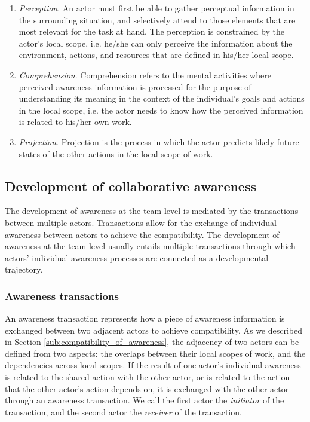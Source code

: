 \begin{enumerate}
	\item \emph{Perception}. An actor must first be able to gather perceptual information in the surrounding situation, and selectively attend to those elements that are most relevant for the task at hand. The perception is constrained by the actor's local scope, i.e. he/she can only perceive the information about the environment, actions, and resources that are defined in his/her local scope.
   \item \emph{Comprehension}. Comprehension refers to the mental activities where perceived awareness information is processed for the purpose of understanding its meaning in the context of the individual's goals and actions in the local scope, i.e. the actor needs to know how the perceived information is related to his/her own work.
	\item \emph{Projection}. Projection is the process in which the actor predicts likely future states of the other actions in the local scope of work.
\end{enumerate}

\subsection{Development of collaborative awareness} %
\label{sub:development_of_collaborative_awareness}
The development of awareness at the team level is mediated by the transactions between multiple actors. Transactions allow for the exchange of individual awareness between actors to achieve the compatibility. The development of awareness at the team level usually entails multiple transactions through which actors' individual awareness processes are connected as a developmental trajectory.

\subsubsection{Awareness transactions} %
\label{ssub:awareness_transactions}
An awareness transaction represents how a piece of awareness information is exchanged between two adjacent actors to achieve compatibility. As we described in Section \ref{sub:compatibility_of_awareness}, the adjacency of two actors can be defined from two aspects: the overlaps between their local scopes of work, and the dependencies across local scopes. If the result of one actor's individual awareness is related to the shared action with the other actor, or is related to the action that the other actor's action depends on, it is exchanged with the other actor through an awareness transaction. We call the first actor the \emph{initiator} of the transaction, and the second actor the \emph{receiver} of the transaction.

